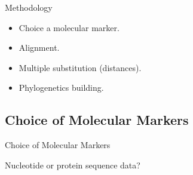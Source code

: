 \documentclass[10pt]{beamer}
\newcommand{\1}{
	\setbeamertemplate{background}{
		\texttt{[image: img/1]}
		\tikz[overlay] \fill[fill opacity=0.75,fill=white] (0,0) rectangle (-\paperwidth,\paperheight);
	}
}
\begin{document}
\begin{frame}{Methodology}{}
	\begin{block}{}
		\begin{itemize}
			\item Choice a molecular marker.
			\item Alignment.
			\item Multiple substitution (distances).
			\item Phylogenetics building.
		\end{itemize}
	\end{block}
\end{frame}

\subsection{Choice of Molecular Markers}

\begin{frame}{Choice of Molecular Markers}{}
	\begin{block}{}
		Nucleotide or protein sequence data?
	\end{block}
\end{frame}
\end{document}
